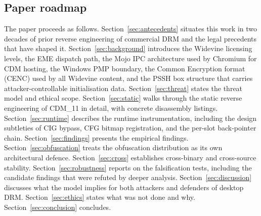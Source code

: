 \documentclass[11pt,letterpaper]{article}
\begin{document}
\subsection*{Paper roadmap}

The paper proceeds as follows. Section~\ref{sec:antecedents} situates
this work in two decades of prior reverse engineering of commercial
DRM and the legal precedents that have shaped it.
Section~\ref{sec:background} introduces the Widevine licensing
levels, the EME dispatch path, the Mojo IPC architecture used by
Chromium for CDM hosting, the Windows PMP boundary, the Common
Encryption format (CENC) used by all Widevine content, and the PSSH
box structure that carries attacker-controllable initialisation data.
Section~\ref{sec:threat} states the threat model and ethical scope.
Section~\ref{sec:static} walks through the static reverse engineering
of CDM\_11 in detail, with concrete disassembly listings.
Section~\ref{sec:runtime} describes the runtime instrumentation,
including the design subtleties of CIG bypass, CFG bitmap
registration, and the per-slot back-pointer chain.
Section~\ref{sec:findings} presents the empirical findings.
Section~\ref{sec:obfuscation} treats the obfuscation distribution as
its own architectural defence. Section~\ref{sec:cross} establishes
cross-binary and cross-source stability. Section~\ref{sec:robustness}
reports on the falsification tests, including the candidate findings
that were refuted by deeper analysis. Section~\ref{sec:discussion}
discusses what the model implies for both attackers and defenders of
desktop DRM. Section~\ref{sec:ethics} states what was not done and
why. Section~\ref{sec:conclusion} concludes.
\end{document}
